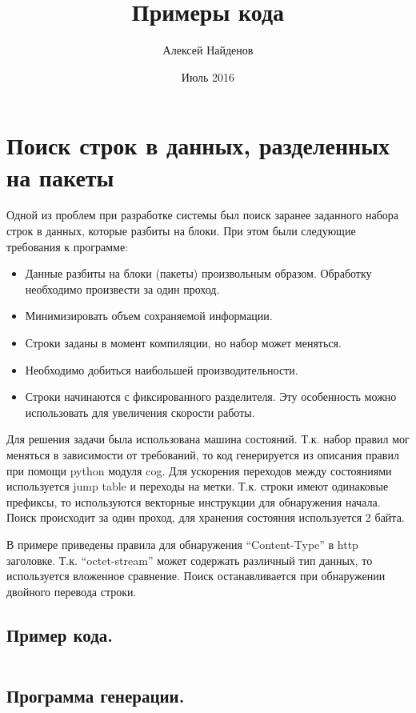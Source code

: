 \documentclass[11pt, a4paper]{article}
\begin{document}
\title{Примеры кода}
\author{Алексей Найденов}
\date{Июль 2016}
\maketitle
\tableofcontents

\section{Поиск строк в данных, разделенных на пакеты}

Одной из проблем при разработке системы был поиск заранее заданного
набора строк в данных, которые разбиты на блоки. При этом были
следующие требования к программе: 

\begin{itemize} 
\item Данные разбиты на блоки (пакеты) произвольным образом. Обработку
  необходимо произвести за один проход.
\item Минимизировать объем сохраняемой информации.
\item Строки заданы в момент компиляции, но набор может меняться.
\item Необходимо добиться наибольшей производительности.
\item Строки начинаются с фиксированного разделителя. Эту особенность
  можно использовать для увеличения скорости работы.
\end{itemize}

Для решения задачи была использована машина состояний. Т.к. набор
правил мог меняться в зависимости от требований, то код генерируется
из описания правил при помощи python модуля cog. Для ускорения
переходов между состояниями используется jump table и переходы на
метки. Т.к. строки имеют одинаковые префиксы, то используются
векторные инструкции для обнаружения начала. Поиск происходит за один
проход, для хранения состояния используется 2 байта.

В примере приведены правила для обнаружения ``Content-Type'' в http
заголовке. Т.к. ``octet-stream'' может содержать различный тип данных,
то используется вложенное сравнение. Поиск останавливается при
обнаружении двойного перевода строки.

\subsection{Пример кода.}
\inputminted{cpp}{code/http_media.cc}

\subsection{Программа генерации.}
\inputminted{python}{code/code_generation.py}
\end{document}
